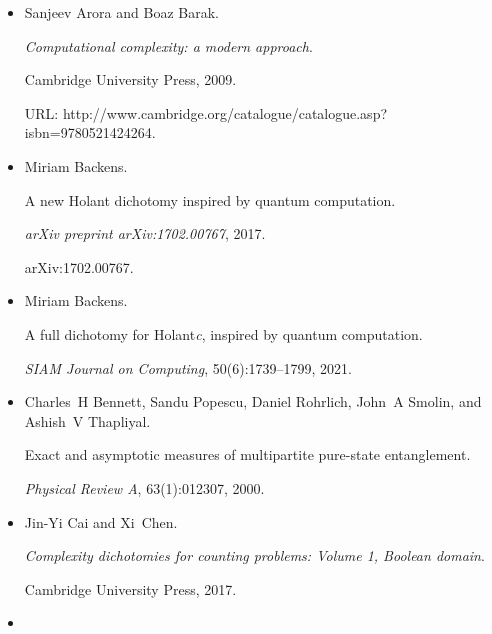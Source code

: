 \documentclass[10pt,a4paper]{article}
\begin{document}
\begin{itemize}


\item[] 
[1]

Sanjeev Arora and Boaz Barak.


\emph{Computational complexity: a modern approach}.


Cambridge University Press, 2009.


URL:
http://www.cambridge.org/catalogue/catalogue.asp?isbn=9780521424264.





\item[] 
[2]

Miriam Backens.


A new Holant dichotomy inspired by quantum computation.


\emph{arXiv preprint arXiv:1702.00767}, 2017.


arXiv:1702.00767.





\item[] 
[3]

Miriam Backens.


A full dichotomy for Holant\emph{c}, inspired by quantum computation.


\emph{SIAM Journal on Computing}, 50(6):1739–1799, 2021.





\item[] 
[4]

Charles H Bennett, Sandu Popescu, Daniel Rohrlich, John A Smolin, and Ashish V
Thapliyal.


Exact and asymptotic measures of multipartite pure-state
entanglement.


\emph{Physical Review A}, 63(1):012307, 2000.





\item[] 
[5]

Jin-Yi Cai and Xi Chen.


\emph{Complexity dichotomies for counting problems: Volume 1,
Boolean domain}.


Cambridge University Press, 2017.





\item[] 
[6]


\end{itemize}
\end{document}
